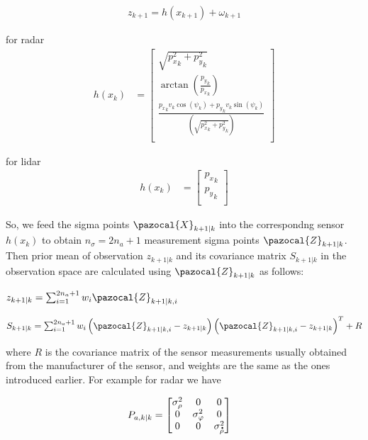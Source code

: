 \documentclass[a4paper,12pt]{article}
\newcommand*{\dt}[1]{%
  \accentset{\mbox{\large\bfseries .}}{#1}}
\begin{document}
  \begin{align}  
  z_{k+1}=h(x_{k+1}) + \omega_{k+1} 
  \end{align}

for radar 
  \begin{align}
    h(x_{k}) &= \begin{bmatrix}
         \sqrt{{p_x^2}_k +{p_y^2}_k} \\
         \arctan({\frac{{p_y}_k}{{p_x}_k}}) \\
         \frac{{p_x}_k{v}_k\cos({\psi}_k) + {p_y}_k{v}_k\sin({\psi}_k) }{(\sqrt{{p_x^2}_k +{p_y^2}_k})}\\
         \end{bmatrix}
  \end{align}

for lidar  
  \begin{align}
    h(x_{k}) &= \begin{bmatrix}
         {p_x}_k \\
         {p_y}_k \\
         \end{bmatrix}
  \end{align}
  
So, we feed the sigma points $\pazocal{X}_{k+1|k}$ into the correspondng sensor $h(x_{k})$ to obtain $n_\sigma = 2n_{a}+1$ measurement sigma points  $\pazocal{Z}_{k+1|k}$. Then prior mean of observation $z_{k+1|k}$ and its covariance matrix $S_{k+1|k}$ in the observation space are calculated using $\pazocal{Z}_{k+1|k}$ as follows:

$z_{k+1|k} = \sum_{i=1}^{2n_a+1}w_i\pazocal{Z}_{k+1|k,i}$

$S_{k+1|k} = \sum_{i=1}^{2n_a+1}w_i\left(\pazocal{Z}_{k+1|k,i}-z_{k+1|k}\right)\left(\pazocal{Z}_{k+1|k,i}-z_{k+1|k}\right)^{T} + R$

where $R$ is the covariance matrix of the sensor measurements usually obtained from the manufacturer of the sensor, and weights are the same as the ones introduced earlier. For example for radar we have 

  \begin{align}
   P_{a,k|k} &= \begin{bmatrix}
         \sigma^2_{\rho} &0 &0\\
          0 &\sigma^2_{\varphi}  &0 \\
          0 &0 &\sigma^2_{\dt{\rho}} \\
         \end{bmatrix}
  \end{align}
\end{document}
